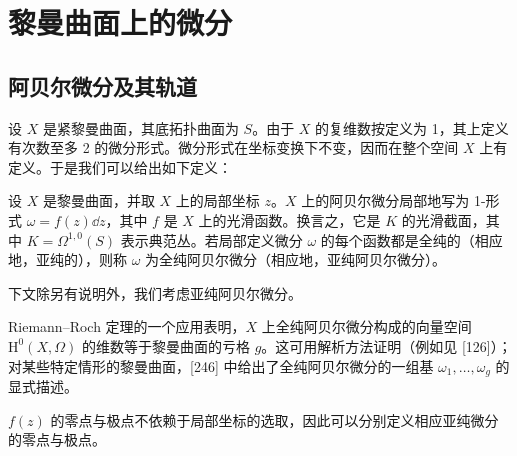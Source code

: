 
\chapter{黎曼曲面上的微分}


\section{阿贝尔微分及其轨道}

设 $X$ 是紧黎曼曲面，其底拓扑曲面为 $S$。由于 $X$ 的复维数按定义为 1，其上定义有次数至多 2 的微分形式。微分形式在坐标变换下不变，因而在整个空间 $X$ 上有定义。于是我们可以给出如下定义：

\begin{definition}[8.1] 设 $X$ 是黎曼曲面，并取 $X$ 上的局部坐标 $z$。$X$ 上的阿贝尔微分局部地写为 1-形式 $\omega=f(z)\dd z$，其中 $f$ 是 $X$ 上的光滑函数。换言之，它是 $K$ 的光滑截面，其中 $K=\Omega^{1,0}(S)$ 表示典范丛。若局部定义微分 $\omega$ 的每个函数都是全纯的（相应地，亚纯的），则称 $\omega$ 为全纯阿贝尔微分（相应地，亚纯阿贝尔微分）。\end{definition}

下文除另有说明外，我们考虑亚纯阿贝尔微分。

Riemann–Roch 定理的一个应用表明，$X$ 上全纯阿贝尔微分构成的向量空间 $\mathrm{H}^0(X,\Omega)$ 的维数等于黎曼曲面的亏格 $g$。这可用解析方法证明（例如见 [126]）；对某些特定情形的黎曼曲面，[246] 中给出了全纯阿贝尔微分的一组基 $\omega_1,\dots,\omega_g$ 的显式描述。

$f(z)$ 的零点与极点不依赖于局部坐标的选取，因此可以分别定义相应亚纯微分的零点与极点。


